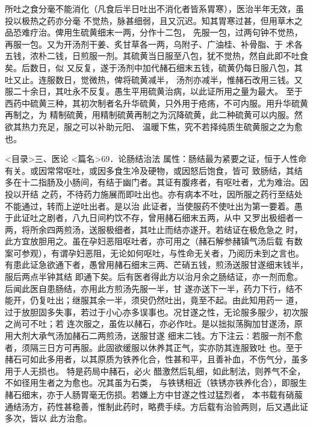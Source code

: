 \documentclass[a4paper,12pt,UTF8,twoside]{ctexbook}
\begin{document}
所吐之食分毫不能消化（凡食后半日吐出不消化者皆系胃寒），医治半年无效，虽投以极热之药亦分毫 
不觉热，脉甚细弱，且又沉迟。知其胃寒过甚，但用草木之品恐难疗治。俾用生硫黄细末一两，分作十二包， 
先服一包，过两句钟不觉热，再服一包。又为开汤剂干姜、炙甘草各一两，乌附子、广油桂、补骨脂、于 
术各五钱，浓朴二钱，日煎服一剂。其硫黄当日服至八包，犹不觉热，然自此即不吐食矣。后数日，似 
又反复，遂于汤剂中加代赭石细末五钱，硫黄仍每日服八包，其吐又止。连服数日，觉微热，俾将硫黄减半， 
汤剂亦减半，惟赭石改用三钱。又服二十余日，其吐永不反复。愚生平用硫黄治病，以此证所用之量为最大。 
至于西药中硫黄三种，其初次制者名升华硫黄，只外用于疮疡，不可内服。用升华硫黄再制之，为 
精制硫黄，用精制硫黄再制之为沉降硫黄，此二种硫黄可以内服。然欲其热力充足，服之可以补助元阳、 
温暖下焦，究不若择纯质生硫黄服之之为愈也。 

<目录>三、医论
<篇名>69．论肠结治法
属性：肠结最为紧要之证，恒于人性命有关。或因常常呕吐，或因多食生冷及硬物，或因怒后饱食，皆可 
致肠结，其结多在十二指肠及小肠间，有结于幽门者。其证有腹疼者，有呕吐者，尤为难治。因投以开结 
之药，不待药力施展而即吐出也。亦有病本不吐，因所服之药行至结处不能通过，转而上逆吐出者。是以治 
此证者，当使服药不使吐出为第一要着。愚于此证吐之剧者，八九日间杓饮不存，曾用赭石细末五两，从中 
又罗出极细者一两，将所余四两煎汤，送服极细者，其吐止而结亦遂开。若结证在极危急之 
时，此方宜放胆用之。虽在孕妇恶阻呕吐者，亦可用之（赭石解参赭镇气汤后载 
有数案可参观），有谓孕妇恶阻，无论如何呕吐，与性命无关者，乃阅历未到之言也。 
有患此证急欲通下者，愚曾用赭石细末三两、芒硝五钱，煎汤送服甘遂细末钱半，服后两点半钟其结 
即通下矣。后有医者得此方以治月余之肠结证，亦一剂而愈。后闻此医自患肠结，亦用此方煎汤先服一半，甘 
遂亦送下一半，药力下行，结不能开，仍复吐出；继服其余一半，须臾仍然吐出，竟至不起。由此知用药一 
道，过于放胆固多失事，若过于小心亦多误事也。况甘遂之性，无论服多服少，初次服之尚可不吐；若 
连次服之，虽佐以赭石，亦必作吐。是以拙拟荡胸加甘遂汤，原用大剂大承气汤加赭石二两煎汤，送服甘遂 
细末二钱。方下注云∶若服一剂不愈者，须隔三日方可再服。此固欲缓服以休养其正气，实亦防其连服致吐 
也。至于赭石可如此多用者，以其原质为铁养化合，性甚和平，且善补血，不伤气分，虽多用于人无损也。 
特是药局中赭石，必火 醋激然后轧细，如此制法，则养气不全，不如径用生者之为愈也。况其虽为石类， 
与铁锈相近（铁锈亦铁养化合），即服生赭石细末，亦于人肠胃毫无伤损。若嫌上方中甘遂之性过猛烈者， 
本书载有硝菔通结汤方，药性甚稳善，惟制此药时，略费手续。方后载有治验两则，后又遇此证多次，皆以 
此方治愈。 
\end{document}
